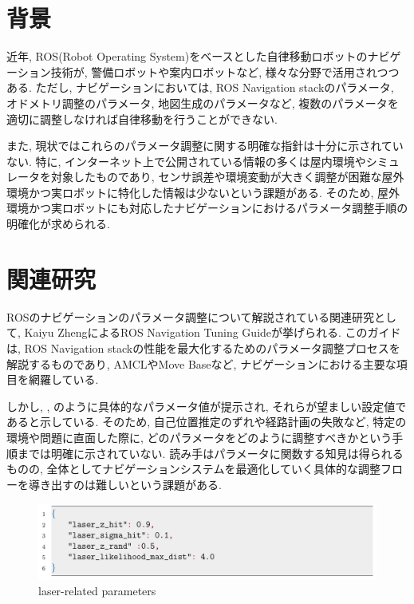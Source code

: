 
\section{背景}
近年, ROS(Robot Operating System)をベースとした自律移動ロボットのナビゲーション技術が, 警備ロボットや案内ロボットなど, 様々な分野で活用されつつある. 
ただし, ナビゲーションにおいては, ROS Navigation stackのパラメータ, オドメトリ調整のパラメータ, 地図生成のパラメータなど, 複数のパラメータを
適切に調整しなければ自律移動を行うことができない. 

また, 現状ではこれらのパラメータ調整に関する明確な指針は十分に示されていない. 
特に, インターネット上で公開されている情報の多くは屋内環境やシミュレータを対象したものであり, 
センサ誤差や環境変動が大きく調整が困難な屋外環境かつ実ロボットに特化した情報は少ないという課題がある. 
そのため, 屋外環境かつ実ロボットにも対応したナビゲーションにおけるパラメータ調整手順の明確化が求められる. 
\newpage
\section{関連研究}
ROSのナビゲーションのパラメータ調整について解説されている関連研究として, Kaiyu ZhengによるROS Navigation Tuning Guideが挙げられる. 
このガイドは, ROS Navigation stackの性能を最大化するためのパラメータ調整プロセスを解説するものであり, AMCLやMove Baseなど, ナビゲーションにおける主要な項目を網羅している. 

しかし, , のように具体的なパラメータ値が提示され, それらが望ましい設定値であると示している. 
そのため, 自己位置推定のずれや経路計画の失敗など, 特定の環境や問題に直面した際に, どのパラメータをどのように調整すべきかという手順までは明確に示されていない. 
読み手はパラメータに関数する知見は得られるものの, 全体としてナビゲーションシステムを最適化していく具体的な調整フローを導き出すのは難しいという課題がある. 
\begin{figure}[hbtp]
  \centering
 \includegraphics[keepaspectratio, scale=0.3]
      {images/senkou_1.png}
 \caption{laser-related parameters}
 \label{Fig:laser-related parameters}
\end{figure}

